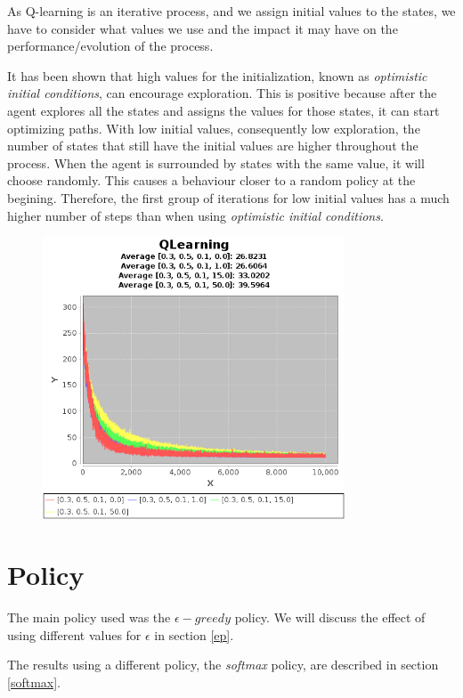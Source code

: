 \documentclass{article}
\begin{document}
As Q-learning is an iterative process, and we assign initial values to the
states, we have to consider what values we use and the impact it may have on the
performance/evolution of the process.

It has been shown that high values for the initialization, known as \emph{optimistic
initial conditions}, can encourage exploration. This is positive because after
the agent explores all the states and assigns the values for those states, it can
start optimizing paths.
With low initial values, consequently low exploration, the number of states that
still have the initial values are higher throughout the process. When the agent
is surrounded by states with the same value, it will choose randomly. This causes a
behaviour closer to a random policy at the begining. Therefore, the first group of
iterations for low initial values has a much higher number of steps than when using \emph{optimistic
initial conditions}.

\begin{figure}[h]
\centering
\includegraphics[width=0.8\textwidth]{res/alpha_03_gama_05_epsilon_01IV_00_to_50.png}
\end{figure}

\section{Policy}
The main policy used was the $\epsilon-greedy$ policy. We will discuss the effect of using different values for $\epsilon$ in section \ref{ep}.

The results using a different policy, the \emph{softmax} policy, are described in section \ref{softmax}.
\end{document}
